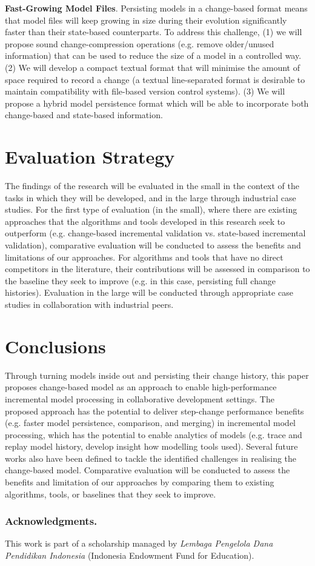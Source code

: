 \documentclass{llncs}
\begin{document}
\textbf{Fast-Growing Model Files}. Persisting models in a change-based format means that model files will keep growing in size during their evolution significantly faster than their state-based counterparts. To address this challenge, (1) we will propose sound change-compression operations (e.g. remove older/unused information) that can be used to reduce the size of a model in a controlled way. (2) We will develop a compact textual format that will minimise the amount of space required to record a change (a textual line-separated format is desirable to maintain compatibility with file-based version control systems). (3) We will propose a hybrid model persistence format which will be able to incorporate both change-based and state-based information. 

\section{Evaluation Strategy}
\label{Evaluation Strategy}
The findings of the research will be evaluated in the small in the context of the tasks in which they will be developed, and in the large through industrial case studies. For the first type of evaluation (in the small), where there are existing approaches that the algorithms and tools developed in this research seek to outperform (e.g. change-based incremental validation vs. state-based incremental validation), comparative evaluation will be conducted to assess the benefits and limitations of our approaches. For algorithms and tools that have no direct competitors in the literature, their contributions will be assessed in comparison to the baseline they seek to improve (e.g. in this case, persisting full change histories). Evaluation in the large will be conducted through appropriate case studies in collaboration with industrial peers.

\section{Conclusions}
\label{Conclusions}
Through turning models inside out and persisting their change history, this paper proposes change-based model as an approach to enable high-performance incremental model processing in collaborative development settings. The proposed approach has the potential to deliver step-change performance benefits (e.g. faster model persistence, comparison, and merging) in incremental model processing, which has the potential to enable analytics of models (e.g. trace and replay model history, develop insight how modelling tools used). Several future works also have been defined to tackle the identified challenges in realising the change-based model. Comparative evaluation will be conducted to assess the benefits and limitation of our approaches by comparing them to existing algorithms, tools, or baselines that they seek to improve.

\subsubsection*{Acknowledgments.} This work is part of a scholarship managed by \emph{Lembaga Pengelola Dana Pendidikan Indonesia} (Indonesia Endowment Fund for Education).

 

\end{document}
